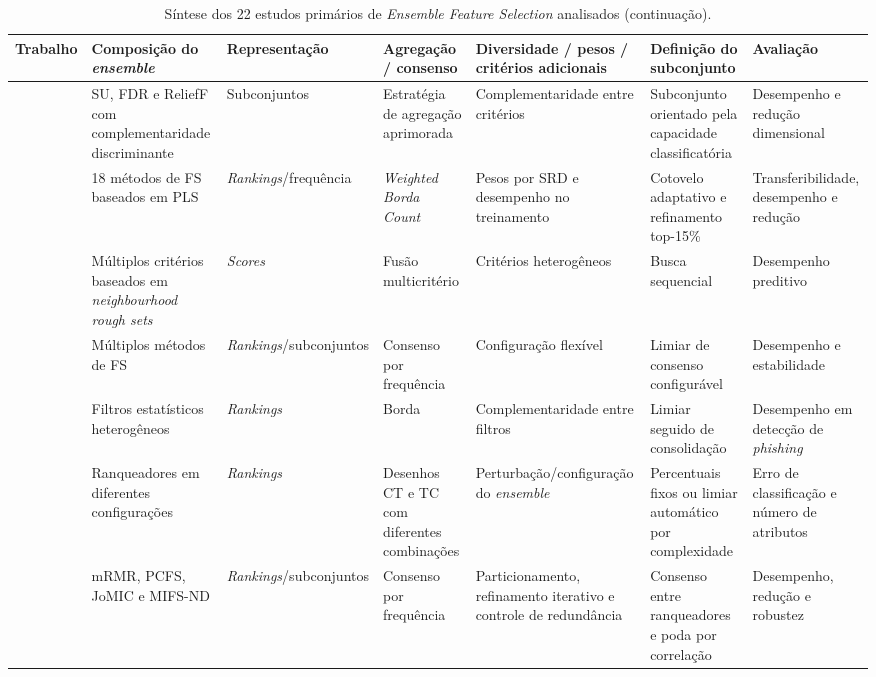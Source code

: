 \begin{table}
\ContinuedFloat
\centering
\caption{Síntese dos 22 estudos primários de \textit{Ensemble Feature Selection} analisados (continuação).}
\fontsize{8}{9.2}\selectfont
\setlength{\tabcolsep}{2.5pt}
\renewcommand{\arraystretch}{1.10}
\begin{tabular}{|P{2.3cm}|P{2.6cm}|P{2.3cm}|P{2.8cm}|P{3.0cm}|P{3.0cm}|P{2.6cm}|}
\hline
\textbf{Trabalho} &
\textbf{Composição do \textit{ensemble}} &
\textbf{Representação} &
\textbf{Agregação / consenso} &
\textbf{Diversidade / pesos / critérios adicionais} &
\textbf{Definição do subconjunto} &
\textbf{Avaliação} \\ \hline
\hline
{} & SU, FDR e ReliefF com complementaridade discriminante & Subconjuntos & Estratégia de agregação aprimorada & Complementaridade entre critérios & Subconjunto orientado pela capacidade classificatória & Desempenho e redução dimensional \\ \hline
{} & 18 métodos de FS baseados em PLS & \textit{Rankings}\slash frequência & \textit{Weighted Borda Count} & Pesos por SRD e desempenho no treinamento & Cotovelo adaptativo e refinamento top-15\% & Transferibilidade, desempenho e redução \\ \hline
{} & Múltiplos critérios baseados em \textit{neighbourhood rough sets} & \textit{Scores} & Fusão multicritério & Critérios heterogêneos & Busca sequencial & Desempenho preditivo \\ \hline
{} & Múltiplos métodos de FS & \textit{Rankings}\slash subconjuntos & Consenso por frequência & Configuração flexível & Limiar de consenso configurável & Desempenho e estabilidade \\ \hline
{} & Filtros estatísticos heterogêneos & \textit{Rankings} & Borda & Complementaridade entre filtros & Limiar seguido de consolidação & Desempenho em detecção de \textit{phishing} \\ \hline
{} & Ranqueadores em diferentes configurações & \textit{Rankings} & Desenhos CT e TC com diferentes combinações & Perturbação\slash configuração do \textit{ensemble} & Percentuais fixos ou limiar automático por complexidade & Erro de classificação e número de atributos \\ \hline
{} & mRMR, PCFS, JoMIC e MIFS-ND & \textit{Rankings}\slash subconjuntos & Consenso por frequência & Particionamento, refinamento iterativo e controle de redundância & Consenso entre ranqueadores e poda por correlação & Desempenho, redução e robustez \\ \hline

\end{tabular}
\end{table}
